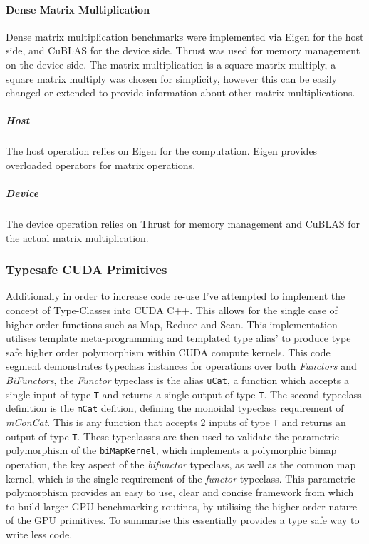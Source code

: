 \paragraph{Dense Matrix Multiplication}
Dense matrix multiplication benchmarks were implemented via Eigen for the host side, and CuBLAS for
the device side. Thrust was used for memory management on the device side. The matrix multiplication
is a square matrix multiply, a square matrix multiply was chosen for simplicity, however this can be
easily changed or extended to provide information about other matrix multiplications.

\subparagraph{Host}
The host operation relies on Eigen for the computation. Eigen provides overloaded operators for
matrix operations.


\subparagraph{Device}
The device operation relies on Thrust for memory management and CuBLAS for the actual matrix
multiplication.


\subsubsection{Typesafe CUDA Primitives} 
Additionally in order to increase code re-use I've attempted to implement the concept of
Type-Classes into CUDA C++. This allows for the single case of higher order functions such as Map,
Reduce and Scan. This implementation utilises template meta-programming and templated type alias'
to produce type safe higher order polymorphism within CUDA compute kernels.
 This code segment demonstrates typeclass instances for
operations over both \textit{Functors} and \textit{BiFunctors}, the \textit{Functor} typeclass is
the alias \lstinline{uCat}, a function which accepts a single input of type \lstinline{T} and
returns a single output of type \lstinline{T}. The second typeclass definition is the
\lstinline{mCat} defition, defining the monoidal typeclass requirement of \textit{mConCat}. This is
any function that accepts 2 inputs of type \lstinline{T} and returns an output of type
\lstinline{T}. These typeclasses are then used to validate the parametric polymorphism of the
\lstinline{biMapKernel}, which implements a polymorphic bimap operation, the key aspect of the
\textit{bifunctor} typeclass, as well as the common map kernel, which is the single requirement of
the \textit{functor} typeclass. This parametric polymorphism provides an easy to use, clear and
concise framework from which to build larger GPU benchmarking routines, by utilising the higher
order nature of the GPU primitives. To summarise this essentially provides a type safe way to write
less code.
